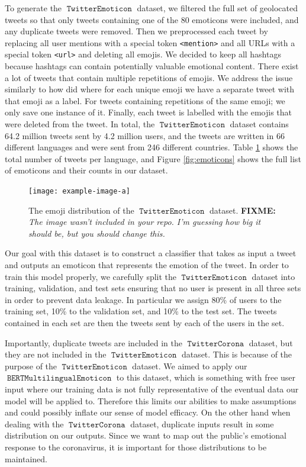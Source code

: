 \documentclass[11pt]{article}
\newcommand{\fixme}[1]{{\color{red} \textbf{FIXME:} {\textit {#1}}}}
\DeclareMathOperator{\model}{\texttt{BERTMultilingualEmoticon}}
\DeclareMathOperator{\emoticon}{\texttt{TwitterEmoticon}}
\DeclareMathOperator{\corona}{\texttt{TwitterCorona}}
\begin{document}
To generate the $\emoticon$ dataset, 
we filtered the full set of geolocated tweets so that only tweets containing one of the 80 emoticons were included,
and any duplicate tweets were removed.
Then we preprocessed each tweet by replacing all user mentions with a special token \texttt{<mention>} and all URLs with a special token \texttt{<url>} and deleting all emojis.
We decided to keep all hashtags because hashtags can contain potentially valuable emotional content.
There exist a lot of tweets that contain multiple repetitions of emojis.
We address the issue similarly to how \cite{100_million_tweets} did where for each unique emoji we have a separate tweet with that emoji as a label. 
For tweets containing repetitions of the same emoji; we only save one instance of it.
Finally, each tweet is labelled with the emojis that were deleted from the tweet.
In total, the $\emoticon$ dataset contains 64.2 million tweets sent by 4.2 million users,
and the tweets are written in 66 different languages and were sent from 246 different countries.
Table \ref{table:lang} shows the total number of tweets per language,
and Figure \ref{fig:emoticons} shows the full list of emoticons and their counts in our dataset. 

\begin{figure}
    \centering
    \texttt{[image: example-image-a]}
    \caption{The emoji distribution of the $\emoticon$ dataset. \fixme{The image wasn't included in your repo.  I'm guessing how big it should be, but you should change this.}} 
    \label{table:lang}
\end{figure}

Our goal with this dataset is to construct a classifier that takes as input a tweet and outputs an emoticon that represents the emotion of the tweet.
In order to train this model properly,
we carefully split the $\emoticon$ dataset into training, validation, and test sets ensuring that no user is present in all three sets in order to prevent data leakage.
In particular we assign 80\% of users to the training set, 10\% to the validation set, and 10\% to the test set.
The tweets contained in each set are then the tweets sent by each of the users in the set.

Importantly, duplicate tweets are included in the $\corona$ dataset,
but they are not included in the $\emoticon$ dataset.
This is because of the purpose of the $\emoticon$ dataset. 
We aimed to apply our $\model$ to this dataset,
which is something with free user input where our training data is not fully representative of the eventual data our model will be applied to.
Therefore this limits our abilities to make assumptions and could possibly inflate our sense of model efficacy.
On the other hand when dealing with the $\corona$ dataset,
duplicate inputs result in some distribution on our outputs.
Since we want to map out the public's emotional response to the coronavirus, it is important 
for those distributions to be maintained.
\end{document}
